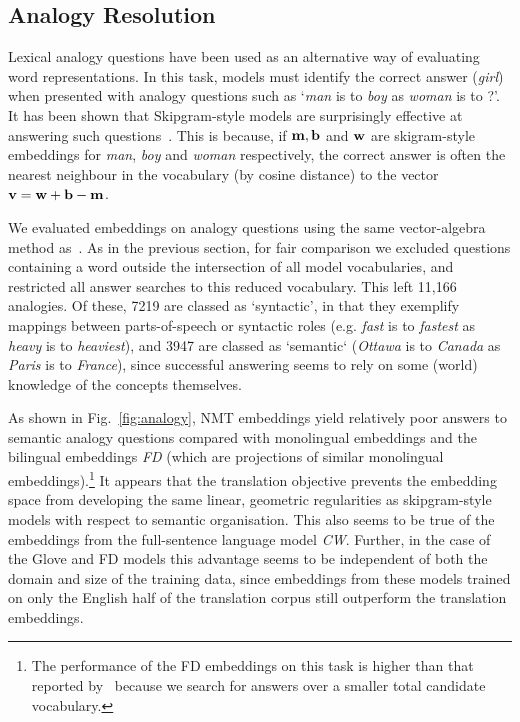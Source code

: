 \subsection{Analogy Resolution}

Lexical analogy questions have been used as an alternative way of evaluating word representations. In this task, models must identify the correct answer (\emph{girl}) when presented with analogy questions such as `\emph{man} is to \emph{boy} as \emph{woman} is to ?'. It has been shown that Skipgram-style models are surprisingly effective at answering such questions~\cite{mikolov2013distributed}. This is because, if \( \bf m, b \) and \( \bf w\) are skigram-style embeddings for \emph{man}, \emph{boy} and \emph{woman} respectively, the correct answer is often the nearest neighbour in the vocabulary (by cosine distance) to the vector \( \bf v = w + b - m \). 

We evaluated embeddings on analogy questions using the same vector-algebra method as~\cite{mikolov2013distributed}. As in the previous section, for fair comparison we excluded questions containing a word outside the intersection of all model vocabularies, and restricted all answer searches to this reduced vocabulary. This left 11,166 analogies. Of these, 7219 are classed as `syntactic', in that they exemplify mappings between parts-of-speech or syntactic roles (e.g. \emph{fast} is to \emph{fastest} as \emph{heavy} is to \emph{heaviest}), and 3947 are classed as `semantic` (\emph{Ottawa} is to \emph{Canada} as \emph{Paris} is to \emph{France}), since successful answering seems to rely on some (world) knowledge of the concepts themselves. 

As shown in Fig.~\ref{fig:analogy}, NMT embeddings yield relatively poor answers to semantic analogy questions compared with monolingual embeddings and the bilingual embeddings \emph{FD} (which are projections of similar monolingual embeddings).\footnote{The performance of the FD embeddings on this task is higher than that reported by~\cite{faruqui2014improving} because we search for answers over a smaller total candidate vocabulary.} It appears that the translation objective prevents the embedding space from developing the same linear, geometric regularities as skipgram-style models with respect to semantic organisation. This also seems to be true of the embeddings from the full-sentence language model \emph{CW}. Further, in the case of the Glove and FD models this advantage seems to be independent of both the domain and size of the training data, since embeddings from these models trained on only the English half of the translation corpus still outperform the translation embeddings. 

